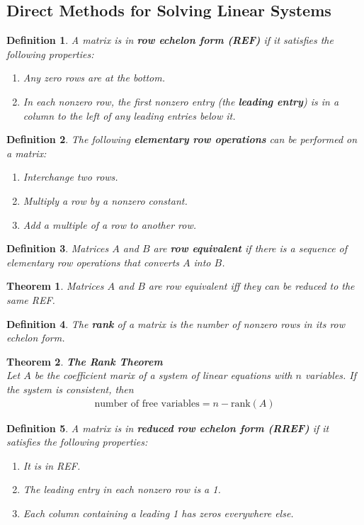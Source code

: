 \documentclass{article}
\theoremstyle{sltheorem}
\newtheorem{definition}{Definition}[section]
\newtheorem{theorem}{Theorem}[section]
\begin{document}
\subsection{Direct Methods for Solving Linear Systems}
\begin{definition}
    A matrix is in \textbf{row echelon form (REF)} if it satisfies the following properties:
    \begin{enumerate}
        \item Any zero rows are at the bottom.
        \item In each nonzero row, the first nonzero entry (the \textbf{leading entry}) is in a column to the left of any leading entries below it.
    \end{enumerate}
\end{definition}
\begin{definition}
    The following \textbf{elementary row operations} can be performed on a matrix:
    \begin{enumerate}
        \item Interchange two rows.
        \item Multiply a row by a nonzero constant.
        \item Add a multiple of a row to another row.
    \end{enumerate}
\end{definition}
\begin{definition}
    Matrices $A$ and $B$ are \textbf{row equivalent} if there is a sequence of elementary row operations that converts $A$ into $B$.
\end{definition}
\begin{theorem}
    Matrices $A$ and $B$ are row equivalent iff they can be reduced to the same REF.
\end{theorem}
\begin{definition}
    The \textbf{rank} of a matrix is the number of nonzero rows in its row echelon form.
\end{definition}
\begin{theorem}
    \textbf{The Rank Theorem}\\
    Let $A$ be the coefficient marix of a system of linear equations with $n$ variables. If the system is consistent, then
    \begin{gather*}
        \text{number of free variables}=n-\text{rank}(A)
    \end{gather*}
\end{theorem}
\begin{definition}
    A matrix is in \textbf{reduced row echelon form (RREF)} if it satisfies the following properties:
    \begin{enumerate}
        \item It is in REF. 
        \item The leading entry in each nonzero row is a 1.
        \item Each column containing a leading 1 has zeros everywhere else.
    \end{enumerate}
\end{definition}
\end{document}
